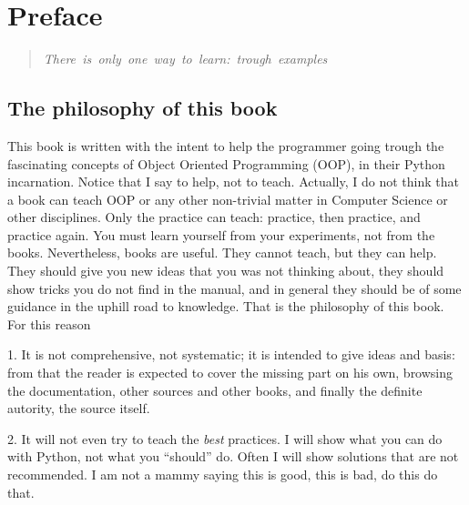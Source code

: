 \documentclass[10pt,english]{article}
\begin{document}
\setcounter{chapter}{-1}


\hypertarget{preface}{}
\section*{Preface}
\begin{quote}
\begin{flushleft}
\emph{There~is~only~one~way~to~learn:~trough~examples}
\end{flushleft}
\end{quote}



\hypertarget{the-philosophy-of-this-book}{}
\subsection*{The philosophy of this book}

This book is written with the intent to help the programmer going trough
the fascinating concepts of Object Oriented Programming (OOP), in their
Python incarnation. Notice that I say to help, not to teach. Actually,
I do not think that a book can teach OOP or any other non-trivial matter 
in Computer Science or other disciplines. Only the
practice can teach: practice, then practice, and practice again. 
You must learn yourself from your experiments, not from the books. 
Nevertheless, books are useful. They cannot teach, but they can help. 
They should give you new ideas that you was not thinking about, they should
show tricks you do not find in the manual, and in general they should be of
some guidance in the uphill road to knowledge. That is the philosophy
of this book. For this reason

1. It is not comprehensive, not systematic; 
it is intended to give ideas and basis: from
that the reader is expected to cover the missing part on his own,
browsing the documentation, other sources and other books, and finally
the definite autority, the source itself.

2. It will not even try to teach the \emph{best} practices. I will show what you can
do with Python, not what you ``should'' do. Often I will show solutions that are
not recommended. I am not a mammy saying this is
good, this is bad, do this do that.
\end{document}
